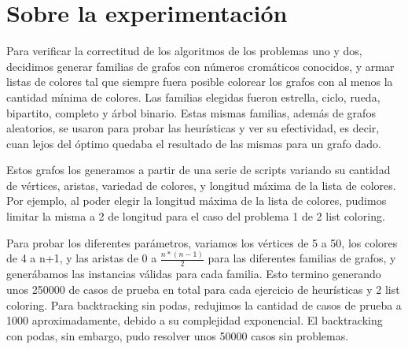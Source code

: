 \documentclass{article}
\theoremstyle{definition}
\theoremstyle{remark}
\begin{document}
{} %

\subtitulo{}
\grupo{}

 
\maketitle

\pagebreak

\tableofcontents

\pagebreak

\section{Sobre la experimentación}

Para verificar la correctitud de los algoritmos de los problemas uno y dos, decidimos generar familias de grafos con números cromáticos conocidos, y armar listas de colores tal que siempre fuera posible colorear los grafos con al menos la cantidad mínima de colores. 
Las familias elegidas fueron estrella, ciclo, rueda, bipartito, completo y árbol binario.
Estas mismas familias, además de grafos aleatorios, se usaron para probar las heurísticas y ver su efectividad, es decir, cuan lejos del óptimo quedaba el resultado de las mismas para un grafo dado.

Estos grafos los generamos a partir de una serie de scripts variando su cantidad de vértices, aristas, variedad de colores, y longitud máxima de la lista de colores. Por ejemplo, al poder elegir la longitud máxima de la lista de colores, pudimos limitar la misma a 2 de longitud para el caso del problema 1 de 2 list coloring.

Para probar los diferentes parámetros, variamos los vértices de 5 a 50, los colores de 4 a n+1, y las aristas de 0 a $\frac{n*(n-1)}{2}$ para las diferentes familias de grafos, y generábamos las instancias válidas para cada familia. Esto termino generando unos 250000 de casos de prueba en total para cada ejercicio de heurísticas y 2 list coloring.
Para backtracking sin podas, redujimos la cantidad de casos de prueba a 1000 aproximadamente, debido a su complejidad exponencial. El backtracking con podas, sin embargo, pudo resolver unos 50000 casos sin problemas.
\end{document}
